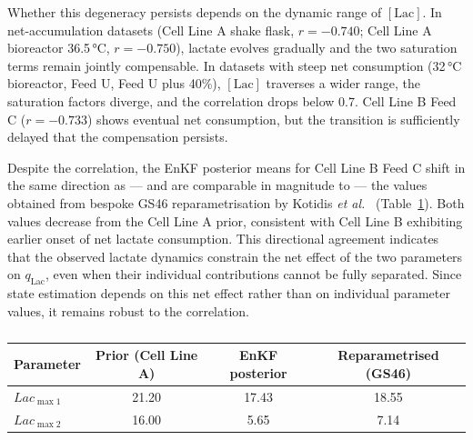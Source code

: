 Whether this degeneracy persists depends on the dynamic range of $[\mathrm{Lac}]$. In net-accumulation datasets (Cell Line A shake flask, $r=-0.740$; Cell Line A bioreactor 36.5\,°C, $r=-0.750$), lactate evolves gradually and the two saturation terms remain jointly compensable. In datasets with steep net consumption (32\,°C bioreactor, Feed U, Feed U plus 40\%), $[\mathrm{Lac}]$ traverses a wider range, the saturation factors diverge, and the correlation drops below 0.7. Cell Line B Feed C ($r=-0.733$) shows eventual net consumption, but the transition is sufficiently delayed that the compensation persists.

Despite the correlation, the EnKF posterior means for Cell Line B Feed C shift in the same direction as — and are comparable in magnitude to — the values obtained from bespoke GS46 reparametrisation by Kotidis \textit{et al.}~\cite{Kotidis2019UseCultures} (Table~\ref{tab:lacmax_comparison}). Both values decrease from the Cell Line A prior, consistent with Cell Line B exhibiting earlier onset of net lactate consumption. This directional agreement indicates that the observed lactate dynamics constrain the net effect of the two parameters on $q_{\mathrm{Lac}}$, even when their individual contributions cannot be fully separated. Since state estimation depends on this net effect rather than on individual parameter values, it remains robust to the correlation.

\begin{table}[ht]
\centering
\renewcommand{\arraystretch}{1.3}
\small
\caption{}
\label{tab:lacmax_comparison}
\begin{tabular}{|l|c|c|c|}
\hline
\rowcolor{gray!30}
\textbf{Parameter} & \textbf{Prior (Cell Line A)} & \textbf{EnKF posterior} & \textbf{Reparametrised (GS46)} \\
\hline
$Lac_{\max1}$ & 21.20 & 17.43 & 18.55 \\
$Lac_{\max2}$ & 16.00 & 5.65 & 7.14 \\
\hline
\end{tabular}
\end{table}

